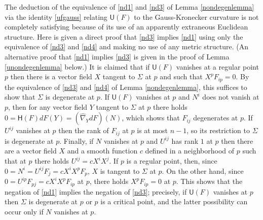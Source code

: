 \documentclass [leqno, 10pt]{amsart}
\theoremstyle{definition}
\numberwithin{equation}{section}
\newcommand{\U}{\mathsf{U}}
\renewcommand{\H}{\mathsf{H}}
\newcommand{\hnabla}{\widehat{\nabla}}
\begin{document}
\begin{remark}
The deduction of the equivalence of \eqref{nd1} and \eqref{nd3} of Lemma \ref{nondegenlemma} via the identity \eqref{ufgauss} relating $\U(F)$ to the Gauss-Kronecker curvature is not completely satisfying because of its use of an apparently extraneous Euclidean structure. Here is given a direct proof that \eqref{nd3} implies \eqref{nd1} using only the equivalence of \eqref{nd3} and \eqref{nd4} and making no use of any metric structure. (An alternative proof that \eqref{nd1} implies \eqref{nd3} is given in the proof of Lemma \ref{unondegenlemma} below.) It is claimed that if $\U(F)$ vanishes at a regular point $p$ then there is a vector field $X$ tangent to $\Sigma$ at $p$ and such that $X^{p}F_{ip} = 0$. By the equivalence of \eqref{nd3} and \eqref{nd4} of Lemma \ref{nondegenlemma}, this suffices to show that $\Sigma$ is degenerate at $p$. If $\U(F)$ vanishes at $p$ and $N^{i}$ does not vanish at $p$, then for any vector field $Y$ tangent to $\Sigma$ at $p$ there holds $0 = \H(F)dF(Y) = (\hnabla_{Y}dF)(N)$, which shows that $F_{ij}$ degenerates at $p$. If $U^{ij}$ vanishes at $p$ then the rank of $F_{ij}$ at $p$ is at most $n-1$, so its restriction to $\Sigma$ is degenerate at $p$. Finally, if $N$ vanishes at $p$ and $U^{ij}$ has rank $1$ at $p$ then there are a vector field $X$ and a smooth function $c$ defined in a neighborhood of $p$ such that at $p$ there holds $U^{ij} = cX^{i}X^{j}$. If $p$ is a regular point, then, since $0 = N^{i} = U^{ij}F_{j} = cX^{i}X^{p}F_{p}$, $X$ is tangent to $\Sigma$ at $p$. On the other hand, since $0 = U^{ip}F_{pj} = cX^{i}X^{p}F_{ip}$ at $p$, there holds $X^{p}F_{ip} = 0$ at $p$. This shows that the negation of \eqref{nd1} implies the negation of \eqref{nd3}; precisely, if $\U(F)$ vanishes at $p$ then $\Sigma$ is degenerate at $p$ or $p$ is a critical point, and the latter possibility can occur only if $N$ vanishes at $p$.
\end{remark}
\end{document}
